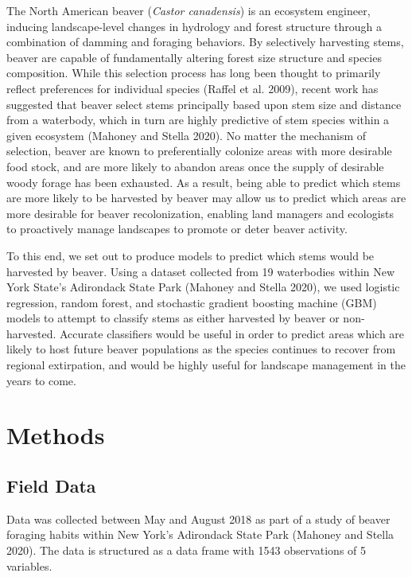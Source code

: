 \documentclass[]{elsarticle} %
\begin{document}
The North American beaver (\emph{Castor canadensis}) is an ecosystem engineer,
inducing landscape-level changes in hydrology and forest structure through a
combination of damming and foraging behaviors. By selectively harvesting stems,
beaver are capable of fundamentally altering forest size structure and species
composition. While this selection process has long been thought to primarily
reflect preferences for individual species (Raffel et al. 2009), recent work has
suggested that beaver select stems principally based upon stem size and distance
from a waterbody, which in turn are highly predictive of stem species within a
given ecosystem (Mahoney and Stella 2020). No matter the mechanism of selection, beaver are
known to preferentially colonize areas with more desirable food stock, and are
more likely to abandon areas once the supply of desirable woody forage has been
exhausted. As a result, being able to predict which stems are more likely to be
harvested by beaver may allow us to predict which areas are more desirable for
beaver recolonization, enabling land managers and ecologists to proactively
manage landscapes to promote or deter beaver activity.

To this end, we set out to produce models to predict which stems would be
harvested by beaver. Using a dataset collected from 19 waterbodies within
New York State's Adirondack State Park (Mahoney and Stella 2020), we used logistic
regression, random forest, and stochastic gradient boosting machine (GBM) models
to attempt to classify stems as either harvested by beaver or non-harvested.
Accurate classifiers would be useful in order to predict areas which are likely
to host future beaver populations as the species continues to recover from
regional extirpation, and would be highly useful for landscape management in
the years to come.

\hypertarget{methods}{%
\section{Methods}\label{methods}}

\hypertarget{field-data}{%
\subsection{Field Data}\label{field-data}}

Data was collected between May and August 2018 as part of a study of beaver
foraging habits within New York's Adirondack State Park (Mahoney and Stella 2020). The
data is structured as a data frame with 1543 observations of
5 variables.
\end{document}

